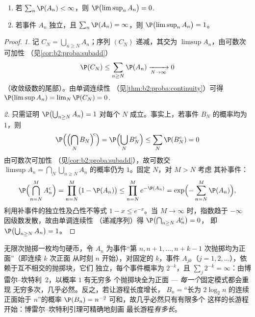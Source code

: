 \begin{theorem}\label{thm:b2:proba:borelcantelli}
\leavevmode
\begin{enumerate}
\item 若 $\sum_{n} \P(A_n) < \infty$，则
$\P\bigl(\limsup_n A_n\bigr) = 0$.
\item 若事件 $A_n$ 独立，且 $\sum_n \P(A_n) =
\infty$，则 $\P\bigl(\limsup_n A_n\bigr) = 1$。
\end{enumerate}
\end{theorem}

\begin{proof}
\emph{1.} 记 $C_N = \bigcup_{n \geq N}A_n$；序列 $(C_N)$
递减，其交为 $\limsup A_n$，由可数次可加性
（见\cref{cor:b2:proba:subadd}）
\[
\P(C_N) \leq \sum_{n \geq N}\P(A_n)
\xrightarrow[N\to\infty]{} 0
\]
（收敛级数的尾部）。由单调连续性
（见\cref{thm:b2:proba:continuity}）可得 $\P(\limsup A_n) =
\lim_N \P(C_N) = 0$.

\emph{2.} 只需证明 $\P\bigl(\bigcup_{n\geq N}A_n\bigr)
= 1$ 对每个 $N$ 成立。事实上，若事件 $B_N$ 的概率均为
$1$，则
\[
\P\Bigl(\Bigl(\bigcap_NB_N\Bigr)^{\!c}\Bigr)
= \P\Bigl(\bigcup_NB_N^c\Bigr)
\leq \sum_N\P(B_N^c) = 0
\]
由可数次可加性
（见\cref{cor:b2:proba:subadd}），故可数交
$\limsup A_n = \bigcap_N\bigcup_{n\geq N}A_n$ 的概率仍为
$1$。固定 $N$，对 $M > N$ 考虑
其补事件：
\[
\P\Bigl(\bigcap_{n=N}^{M} A_n^c\Bigr)
= \prod_{n=N}^{M}\bigl(1 - \P(A_n)\bigr)
\leq \prod_{n=N}^{M} e^{-\P(A_n)}
= \exp\Bigl(-\sum_{n=N}^M \P(A_n)\Bigr) ,
\]
利用补事件的独立性及凸性不等式 $1 -
x \leq e^{-x}$。当 $M \to \infty$ 时，指数趋于 $-\infty$
因级数发散，故由单调连续性
（递减序列）得 $\P\bigl(\bigcap_{n \geq N}A_n^c\bigr) = 0$，
即 $\P\bigl(\bigcup_{n \geq N}A_n\bigr) = 1$。
\end{proof}

\begin{example}[无穷多段连续正面]\label{ex:b2:proba:runs}
无限次抛掷一枚均匀硬币，令 $A_n$ 为事件“第 $n,
n+1, \dots, n + k - 1$ 次抛掷均为正面”（即连续 $k$ 次正面
从时刻 $n$ 开始），对固定的 $k$，事件 $A_{jk}$（$j =
1, 2, \dots$），依赖于互不相交的抛掷块，它们
独立，每个事件概率为 $2^{-k}$，且 $\sum_j 2^{-k} =
\infty$：由博雷尔--坎特利~2，以概率 $1$ 有无穷多
个抛掷块全为正面 --- \emph{每一个}固定模式都会重现
无穷多次，几乎必然。反之，若让游程长度增长，
$B_n = {}$“长为 $2\log_2 n$ 的连续正面始于
$n$”的概率 $\P(B_n) = n^{-2}$ 可和，故几乎必然只有有限多个
这样的长游程开始：博雷尔--坎特利引理可精确地刻画
最长游程\emph{有多长}。
\end{example}

